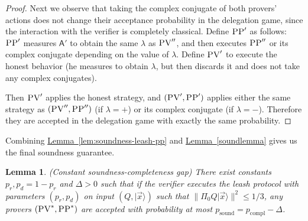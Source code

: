 \documentclass[11pt]{article}
\numberwithin{equation}{section}
\newtheorem{lemma}[theorem]{Lemma}
\theoremstyle{definition}
\theoremstyle{plain}
\newcommand{\expref}[2]{\hyperref[#2]{#1~\ref{#2}}}
\newcommand{\ket}[1]{|#1\rangle}
\DeclareMathOperator{\sound}{sound}
\DeclareMathOperator{\compl}{compl}
\newcommand{\reg}[1]{{\textsf{#1}}}
\newcommand{\pv}{\textsc{PV}}
\newcommand{\pp}{\textsc{PP}}
\begin{document}
\begin{proof}
Next we observe that taking the complex conjugate of both provers' actions does not change their acceptance probability in the delegation game, since the interaction with the verifier is completely classical. Define $\pp'$ as follows: $\pp'$ measures $\reg{A}'$ to obtain the same $\lambda$ as $\pv''$, and then executes $\pp''$ or its complex conjugate depending on the value of $\lambda$. Define $\pv'$ to execute the honest behavior (he measures to obtain $\lambda$, but then discards it and does not take any complex conjugates). 

Then $\pv'$ applies the honest strategy, and $(\pv',\pp')$ applies either the same strategy as $(\pv'',\pp'')$ (if $\lambda=+$) or its complex conjugate (if $\lambda=-$). Therefore they are accepted in the delegation game with exactly the same probability. 
\end{proof}

\noindent Combining \expref{Lemma}{lem:soundness-leash-pp} and \expref{Lemma}{soundlemma} gives us the final soundness guarantee.

\begin{lemma}\label{lem:leash-soundness} (Constant soundness-completeness gap)
There exist constants $p_r,p_d=1-p_r$ and $\Delta>0$ such that if the verifier executes the leash protocol with parameters $(p_r,p_d)$ on input $(Q,\ket{\vec{x}})$ such that $\|\Pi_0 Q\ket{\vec{x}}\|^2 \leq 1/3$, any provers $(\pv^*,\pp^*)$ are accepted with probability at most \mbox{$p_{\sound}=p_{\compl}-\Delta$}.  
\end{lemma}
\end{document}
